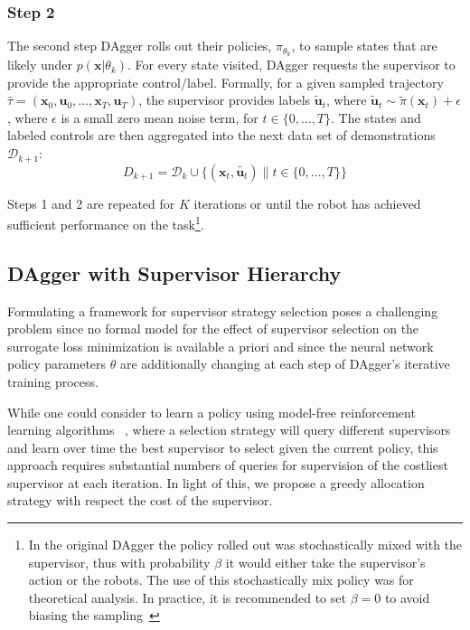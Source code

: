 \documentclass[10pt, conference]{ieeeconf}      %
\newcommand{\bu}{\mathbf{u}}
\newcommand{\bx}{\mathbf{x}}
\newcommand{\fpnote}[1]{\ifthenelse{ \boolean{include-notes}}%
 {\textcolor{blue}{\textbf{FP: #1}}}{}}
\begin{document}
 \subsubsection{Step 2}
The second step  DAgger rolls out their policies, $\pi_{\theta_{k}}$, to sample states that are likely under $p(\bx|\theta_{k})$.  For every state visited, DAgger requests the supervisor to provide the appropriate control/label. Formally, for a given sampled trajectory  $\hat{\tau} = (\bx_0,\bu_0,...,\bx_T,\bu_T )$, the supervisor provides labels $\tilde{\bu}_t$, where $\tilde{\bu}_t \sim \tilde{\pi}(\bx_t) + \epsilon$, where $\epsilon$ is a small zero mean noise term, for $t\in \{0, \ldots, T\}$.
The states and labeled controls are then aggregated into the next data set of demonstrations $\mathcal{D}_{k+1}$:
$$D_{k+1}=\mathcal{D}_k \cup \{(\bx_t,\tilde{\bu_t})\|t\in\{0,\ldots,T\}\} $$


Steps 1 and 2 are repeated for $K$ iterations or until 
the robot has achieved sufficient performance on the task\footnote{In the original DAgger the policy rolled out
was stochastically mixed with the supervisor, thus with probability $\beta$ it would either take the supervisor's action
or the robots. The use of this stochastically mix policy was for theoretical analysis. In practice, it is recommended
to set $\beta = 0$ to avoid biasing the sampling~\cite{NIPS2014_5421,ross2010reduction}}.


\subsection{DAgger with Supervisor Hierarchy}
Formulating a framework for supervisor strategy selection poses a challenging problem since no formal model
for the effect of supervisor selection on the surrogate loss minimization is available a priori and since the
neural network policy parameters $\theta$ are additionally changing at each step of DAgger's iterative training process.

While one could consider to learn a policy using model-free reinforcement learning algorithms
~\cite{sutton1998reinforcement}, where a selection strategy will query different supervisors and learn over time the
best supervisor to select given the current policy, this approach requires substantial numbers of 
queries for supervision of the costliest supervisor at each iteration. In light of this, we propose a greedy allocation
strategy with respect the cost of the supervisor.
\end{document}
